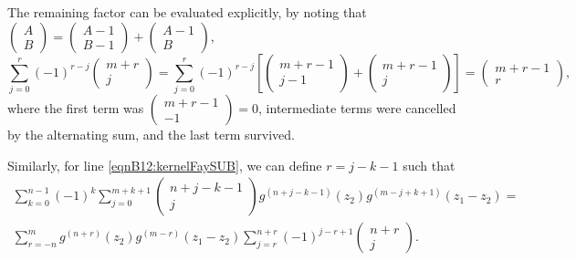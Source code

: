 The remaining factor can be evaluated explicitly, by noting that $\begin{pmatrix} A \\ B \end{pmatrix} = \begin{pmatrix} A-1 \\ B-1 \end{pmatrix} + \begin{pmatrix} A-1 \\ B \end{pmatrix}$,
\begin{equation}
    \sum_{j=0}^r (-1)^{r-j} \begin{pmatrix} m+r \\ j \end{pmatrix} =
    \sum_{j=0}^r (-1)^{r-j} \left[\begin{pmatrix} m+r-1 \\ j-1 \end{pmatrix} + \begin{pmatrix} m+r-1 \\ j \end{pmatrix}\right]
    = \begin{pmatrix} m+r-1 \\ r \end{pmatrix},
\end{equation}
where the first term was $\begin{pmatrix} m+r-1 \\ -1 \end{pmatrix}=0$, intermediate terms were cancelled by the alternating sum, and the last term survived.

Similarly, for line \ref{eqnB12:kernelFaySUB}, we can define $r=j-k-1$ such that
\begin{align}
    \sum_{k=0}^{n-1} (-1)^k \sum_{j=0}^{m+k+1} \begin{pmatrix} n+j-k-1 \\ j \end{pmatrix} g^{(n+j-k-1)}(z_2) g^{(m-j+k+1)}(z_1-z_2) = \\
    \sum_{r=-n}^m g^{(n+r)}(z_2) g^{(m-r)}(z_1-z_2) \sum_{j=r}^{n+r} (-1)^{j-r+1} \begin{pmatrix}n+r \\ j\end{pmatrix}.
\end{align}

